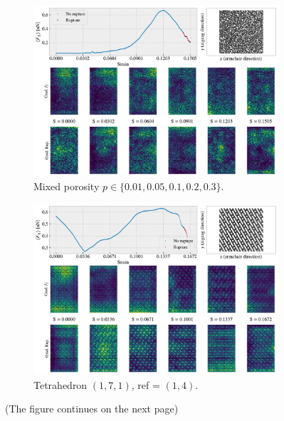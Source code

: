 \begin{figure}[!htb]
  \centering
  \begin{subfigure}[t]{1\textwidth}
      \centering
      \includegraphics[width=0.75\linewidth]{figures/search/grad_cam_GA_RN_start_top0.pdf}
      \caption{Mixed porosity $p \in \{0.01, 0.05, 0.1, 0.2, 0.3\}$.}
      \label{fig:GC_mixed_p}
  \end{subfigure}
  \hfill
  \vspace{1cm}
  \begin{subfigure}[t]{1\textwidth}
      \centering
      \includegraphics[width=0.75\linewidth]{figures/search/grad_cam_pop_1_7_1_1_4.pdf}
      \caption{Tetrahedron $(1,7,1)$, ref = $(1,4)$.}
      \label{fig:GC_pop_search}
  \end{subfigure}
  \hfill
  \caption{(The figure continues on the next page)}
\end{figure}

